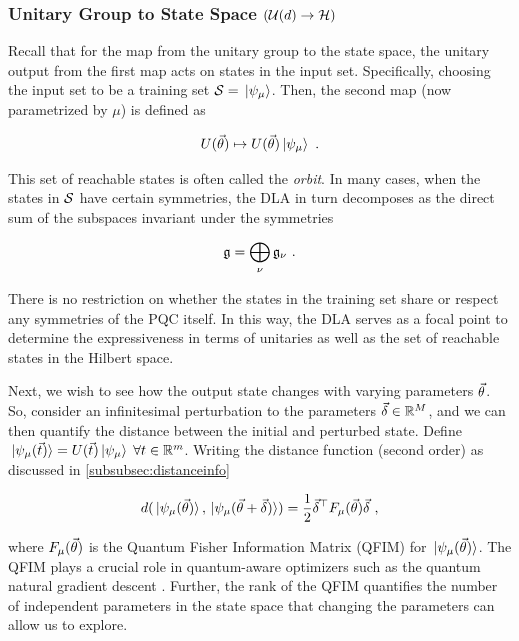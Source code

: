 \subsubsection{Unitary Group to State Space \((\mathcal{U}(d) \to
\mathcal{H})\)} 

Recall that for the map from the unitary group to the state space, the unitary
output from the first map acts on states in the input set. Specifically,
choosing the input set to be a training set \(\mathcal{S} = \ket*{\psi_\mu}\).
Then, the second map (now parametrized by \(\mu\)) is defined as

\begin{equation}
    U(\vec{\theta}) \mapsto U(\vec{\theta})\ket*{\psi_\mu}~.
\end{equation}

This set of reachable states is often called the \emph{orbit}. In many cases,
when the states in \(\mathcal{S}\) have certain symmetries, the DLA in turn
decomposes as the direct sum of the subspaces invariant under the symmetries

\begin{equation}
    \mathfrak{g} = \bigoplus_\nu \mathfrak{g}_\nu~.
\end{equation}

There is no restriction on whether the states in the training set share or
respect any symmetries of the PQC itself. In this way, the DLA serves as a focal
point to determine the expressiveness in terms of unitaries as well as the set
of reachable states in the Hilbert space.

Next, we wish to see how the output state changes with varying parameters
\(\vec{\theta}\). So, consider an infinitesimal perturbation to the parameters
\(\vec{\delta} \in \mathbb{R}^M\), and we can then quantify the distance between the
initial and perturbed state. Define \(\ket*{\psi_\mu(\vec{t})} =
U(\vec{t})\ket*{\psi_\mu}\;\forall t \in \mathbb{R}^m\). Writing the distance
function (second order) as discussed in \autoref{subsubsec:distanceinfo}

\begin{equation}
    d(\ket*{\psi_\mu (\vec{\theta})}, \ket*{\psi_\mu(\vec{\theta} + \vec{\delta})}) 
        = \frac{1}{2} \vec{\delta}^\top F_\mu(\vec{\theta}) \vec{\delta}~,
\end{equation}

where \(F_\mu(\vec{\theta})\) is the Quantum Fisher Information Matrix (QFIM) for
\(\ket*{\psi_\mu(\vec{\theta})}\). The QFIM plays a crucial role in quantum-aware
optimizers such as the quantum natural gradient descent
\cite{stokes2020quantum,koczor2019quantum,gacon2021simultaneous,haug2021natural}.
Further, the rank of the QFIM quantifies the number of independent parameters in
the state space that changing the parameters can allow us to explore.


